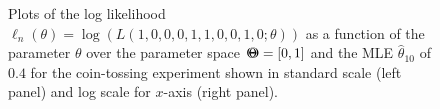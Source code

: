 \begin{figure}[htpb]
\caption{Plots of the log likelihood $\ell_n(\theta)=\log(L(1,0,0,0,1,1,0,0,1,0;\theta))$ as a function of the parameter $\theta$ over the parameter space ${\Theta}\mspace{-11 mu}{\Theta}=[0,1]$ and the MLE $\widehat{\theta}_{10}$ of $0.4$ for the coin-tossing experiment shown in standard scale (left panel) and log scale for $x$-axis (right panel).\label{F:BernoulliMLE}}
\centering   {}
\end{figure}


